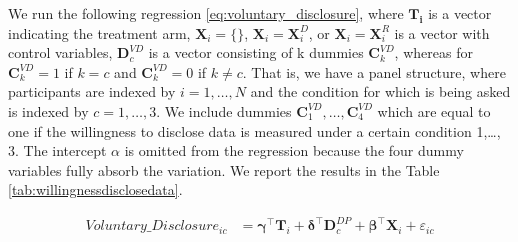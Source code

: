\documentclass[11pt]{article}
\begin{document}
We run the following regression \ref{eq:voluntary_disclosure}, where $\mathbf{T_i}$ is a vector indicating the treatment arm, $\mathbf{X}_{i} = \{\}$, $\mathbf{X}_{i} = \mathbf{X}_{i}^{D}$, or  $\mathbf{X}_{i} = \mathbf{X}_{i}^{R}$ is a vector with control variables, $\mathbf{D}_c^{VD}$ is a vector consisting of k dummies $\mathbf{C}_k^{VD}$, whereas for $\mathbf{C}_k^{VD}=1$ if $k=c$ and $\mathbf{C}_k^{VD}=0$ if $k \neq c$. That is, we have a panel structure, where participants are indexed by $i=1,\ldots,N$ and the condition for which is being asked is indexed by $c=1,\ldots,3$. We include dummies $\mathbf{C}_1^{VD},\ldots, \mathbf{C}_4^{VD}$ which are equal to one if the willingness to disclose data is measured under a certain condition 1,\ldots, 3. The intercept $\alpha$ is omitted from the regression because the four dummy variables fully absorb the variation. We report the results in the Table \ref{tab:willingnessdisclosedata}.  
\begin{center}
\begin{align}
    \label{eq:voluntary_disclosure}
    \text{$Voluntary\_Disclosure_{ic}$}
    &= \boldsymbol{\gamma}^{\top}\mathbf{T}_i + \boldsymbol{\delta}^{\top}\mathbf{D}_c^{DP}+ \boldsymbol{\beta}^{\top}\mathbf{X}_{i} + \varepsilon_{ic}
\end{align}
\end{center}
\end{document}
